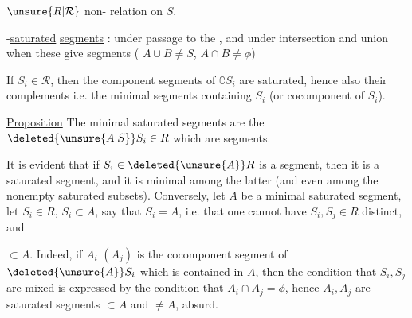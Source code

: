 $\unsure{R|\mathcal{R}}$ non-  relation on $S$.

-\uline{saturated} \uline{segments} :  under passage to the , and under intersection and union when these give segments ( $A\cup B\ne S$, $A\cap B\ne\phi$)

If $S_i\in\mathcal{R}$, then the component segments of $\complement S_i$ are saturated, hence also their complements i.e. the minimal segments containing $S_i$ (or cocomponent  of $S_i$). 

\noindent\llap{\rule[-.92\baselineskip]{.4pt}{1.8\baselineskip}\hspace{.35em}}\uline{Proposition} The minimal saturated segments are the $\deleted{\unsure{A|S}}S_i\in R$ which are segments.

\reversemarginpar{}

It is evident that if $S_i\in\deleted{\unsure{A}}R$ is a segment, then it is a saturated segment, and it is minimal among the latter (and even among the nonempty saturated subsets). Conversely, let $A$ be a minimal saturated segment,  let $S_i\in R$, $S_i\subset A$,   say that $S_i=A$,  i.e. that one cannot have $S_i,S_j\in R$ distinct, and
\par\noindent\begin{minipage}[t]{.23\linewidth}
\vspace{0pt}
\end{minipage}\hfill\begin{minipage}[t]{.73\linewidth}
\vspace{0pt}
$\subset A$. Indeed, if $A_i$ $(A_j)$ is the cocomponent segment of $\deleted{\unsure{A}}S_i$ which is contained in $A$, then the condition that $S_i,S_j$ are  mixed is expressed by the condition that $A_i\cap A_j=\phi$, hence $A_i,A_j$ are saturated segments $\subset A$ and $\ne A$, absurd.
\end{minipage}
\normalmarginpar
